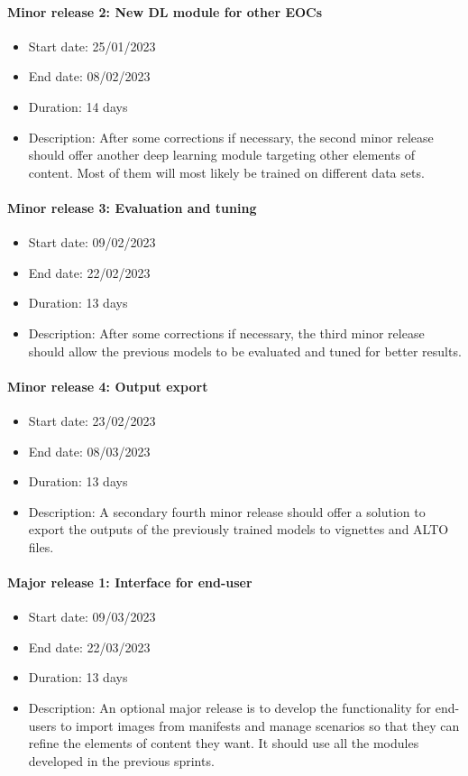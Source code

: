 \documentclass{polytech/polytech}
\numberwithin{figure}{chapter}
\begin{document}
\begin{appendix}
\paragraph{Minor release 2: New DL module for other EOCs}
\begin{itemize}
    \item Start date: 25/01/2023
    \item End date: 08/02/2023
    \item Duration: 14 days
    \item
        Description: After some corrections if necessary, the second minor release should offer another deep learning module targeting other elements of content. Most of them will most likely be trained on different data sets.
\end{itemize}

\paragraph{Minor release 3: Evaluation and tuning}
\begin{itemize}
    \item Start date: 09/02/2023
    \item End date: 22/02/2023
    \item Duration: 13 days
    \item
        Description: After some corrections if necessary, the third minor release should allow the previous models to be evaluated and tuned for better results.
\end{itemize}

\paragraph{Minor release 4: Output export}
\begin{itemize}
    \item Start date: 23/02/2023
    \item End date: 08/03/2023
    \item Duration: 13 days
    \item
        Description: A secondary fourth minor release should offer a solution to export the outputs of the previously trained models to vignettes and ALTO files.
\end{itemize}

\paragraph{Major release 1: Interface for end-user}
\begin{itemize}
    \item Start date: 09/03/2023
    \item End date: 22/03/2023
    \item Duration: 13 days
    \item
        Description: An optional major release is to develop the functionality for end-users to import images from manifests and manage scenarios so that they can refine the elements of content they want.
		      It should use all the modules developed in the previous sprints.
\end{itemize}


\end{appendix}
\end{document}
